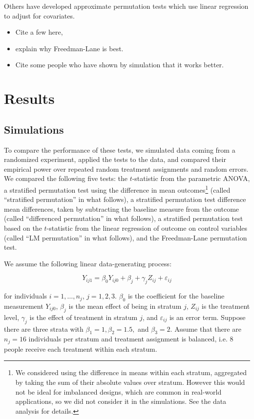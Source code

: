 \documentclass[11pt]{article}
\newcommand{\bit}{\begin{itemize}}
\newcommand{\eit}{\end{itemize}}
\begin{document}
Others have developed approximate permutation tests which use linear regression to adjust for covariates. 
\bit
\item Cite a few here, 
\item explain why Freedman-Lane is best. 
\item Cite some people who have shown by simulation that it works better.
\eit


\section{Results}
\subsection{Simulations}

To compare the performance of these tests, we simulated data coming from a randomized experiment, applied the tests to the data, and compared their empirical power over repeated random treatment assignments and random errors.
We compared the following five tests:
the $t$-statistic from the parametric ANOVA,
a stratified permutation test using the difference in mean outcomes\footnote{ We considered using the difference in means within each stratum, aggregated by taking the sum of their absolute values over stratum. However this would not be ideal for imbalanced designs, which are common in real-world applications, so we did not consider it in the simulations.  See the data analysis for details.}
 (called ``stratified permutation'' in what follows),
a stratified permutation test difference mean differences, taken by subtracting the baseline measure from the outcome (called ``differenced permutation'' in what follows),
a stratified permutation test based on the $t$-statistic from the linear regression of outcome on control variables (called ``LM permutation'' in what follows),
and the Freedman-Lane permutation test.
 

We assume the following linear data-generating process:

$$Y_{ij1} =\beta_0Y_{ij0} + \beta_{j} + \gamma_j Z_{ij} + \varepsilon_{ij}$$

for individuals $i = 1, \dots, n_j$, $j = 1, 2, 3$.
$\beta_0$ is the coefficient for the baseline measurement $Y_{ij0}$, 
$\beta_j$ is the mean effect of being in stratum $j$, 
$Z_{ij}$ is the treatment level, 
$\gamma_j$ is the effect of treatment in stratum $j$, 
and $\varepsilon_{ij}$ is an error term.
Suppose there are three strata with $\beta_1 = 1, \beta_2 = 1.5,$ and $\beta_3 = 2$.
Assume that there are $n_j = 16$ individuals per stratum and treatment assignment is balanced, i.e. 8 people receive each treatment within each stratum.
\end{document}
